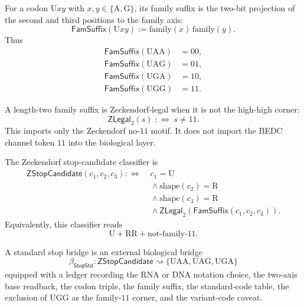 \begin{definition}
\label{def:philosophy-family-suffix}
For a codon $\mathrm{U}xy$ with
$x,y\in\{\mathrm{A},\mathrm{G}\}$, its family suffix is the two-bit
projection of the second and third positions to the family axis:
$$
  \mathsf{FamSuffix}(\mathrm{U}xy)
  :=
  \mathrm{family}(x)\,\mathrm{family}(y).
$$
Thus
$$
\begin{aligned}
  \mathsf{FamSuffix}(\mathrm{UAA}) &= 00,\\
  \mathsf{FamSuffix}(\mathrm{UAG}) &= 01,\\
  \mathsf{FamSuffix}(\mathrm{UGA}) &= 10,\\
  \mathsf{FamSuffix}(\mathrm{UGG}) &= 11.
\end{aligned}
$$
\end{definition}

\begin{definition}
\label{def:philosophy-zeckendorf-legal-family-suffix}
A length-two family suffix is Zeckendorf-legal when it is not the
high-high corner:
$$
  \mathsf{ZLegal}_{2}(s)\;:\Longleftrightarrow\;s\neq 11.
$$
This imports only the Zeckendorf no-$11$ motif. It does not import the
BEDC channel token $11$ into the biological layer.
\end{definition}

\begin{definition}
\label{def:philosophy-zstop-candidate-classifier}
The Zeckendorf stop-candidate classifier is
$$
\begin{aligned}
  \mathsf{ZStopCandidate}(c_{1},c_{2},c_{3})
  :\Longleftrightarrow\;&
  c_{1}=\mathrm{U}\\
  &{}\wedge \mathrm{shape}(c_{2})=\mathrm{R}\\
  &{}\wedge \mathrm{shape}(c_{3})=\mathrm{R}\\
  &{}\wedge
  \mathsf{ZLegal}_{2}(\mathsf{FamSuffix}(c_{1},c_{2},c_{3})).
\end{aligned}
$$
Equivalently, this classifier reads
$$
  \mathrm{U}+\mathrm{RR}+\text{not-family-}11.
$$
\end{definition}

\begin{definition}
\label{def:philosophy-standard-stop-bridge}
A standard stop bridge is an external biological bridge
$$
  \beta_{\mathsf{StopStd}}
  :
  \mathsf{ZStopCandidate}
  \rightsquigarrow
  \{\mathrm{UAA},\mathrm{UAG},\mathrm{UGA}\}
$$
equipped with a ledger recording the RNA or DNA notation choice, the
two-axis base readback, the codon triple, the family suffix, the
standard-code table, the exclusion of $\mathrm{UGG}$ as the family-$11$
corner, and the variant-code caveat.
\end{definition}

